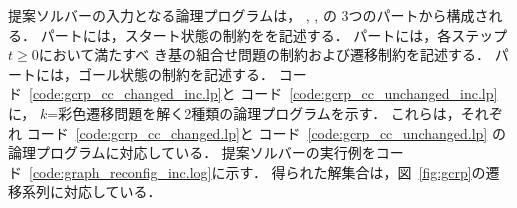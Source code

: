 





提案ソルバーの入力となる論理プログラムは，
, , 
の 3つのパートから構成される．
 パートには，スタート状態の制約をを記述する．
 パートには，各ステップ$t\geq 0$において満たすべ
き基の組合せ問題の制約および遷移制約を記述する．
 パートには，ゴール状態の制約を記述する．
%
コード~\ref{code:gcrp_cc_changed_inc.lp}と
コード~\ref{code:gcrp_cc_unchanged_inc.lp}に，
$k$=彩色遷移問題を解く2種類の論理プログラムを示す．
これらは，それぞれ
コード~\ref{code:gcrp_cc_changed.lp}と
コード~\ref{code:gcrp_cc_unchanged.lp}
の論理プログラムに対応している．
提案ソルバーの実行例をコード~\ref{code:graph_reconfig_inc.log}に示す．
得られた解集合は，図~\ref{fig:gcrp}の遷移系列に対応している．

